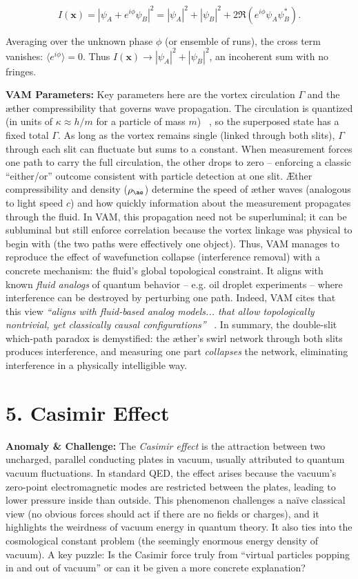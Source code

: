 \documentclass[a4paper, aps,preprint,superscriptaddress, 12pt]{revtex4}
\begin{document}
\begin{equation}
    I(\mathbf{x}) = |\psi_A + e^{i\phi}\psi_B|^2 = |\psi_A|^2 + |\psi_B|^2 + 2\Re(e^{i\phi}\psi_A \psi_B^*).
\end{equation}

Averaging over the unknown phase $\phi$ (or ensemble of runs), the cross term vanishes: $\langle e^{i\phi}\rangle = 0$. Thus $I(\mathbf{x}) \to |\psi_A|^2 + |\psi_B|^2$, an incoherent sum with no fringes.


\textbf{VAM Parameters:} Key parameters here are the vortex circulation $\Gamma$ and the æther compressibility that governs wave propagation. The circulation is quantized (in units of $\kappa \approx h/m$ for a particle of mass $m$)~\cite{Iskandarani2025c} , so the superposed state has a fixed total $\Gamma$. As long as the vortex remains single (linked through both slits), $\Gamma$ through each slit can fluctuate but sums to a constant. When measurement forces one path to carry the full circulation, the other drops to zero – enforcing a classic “either/or” outcome consistent with particle detection at one slit. Æther compressibility and density ($\rho_{\ae}$) determine the speed of æther waves (analogous to light speed $c$) and how quickly information about the measurement propagates through the fluid. In VAM, this propagation need not be superluminal; it can be subluminal but still enforce correlation because the vortex linkage was physical to begin with (the two paths were effectively one object). Thus, VAM manages to reproduce the effect of wavefunction collapse (interference removal) with a concrete mechanism: the fluid’s global topological constraint. It aligns with known \textit{fluid analogs} of quantum behavior – e.g. oil droplet experiments – where interference can be destroyed by perturbing one path. Indeed, VAM cites that this view \textit{“aligns with fluid-based analog models... that allow topologically nontrivial, yet classically causal configurations”}~\cite{Iskandarani2025c} . In summary, the double-slit which-path paradox is demystified: the æther’s swirl network through both slits produces interference, and measuring one part \textit{collapses} the network, eliminating interference in a physically intelligible way.


\section*{5. Casimir Effect}

\textbf{Anomaly \& Challenge: } The \textit{Casimir effect} is the attraction between two uncharged, parallel conducting plates in vacuum, usually attributed to quantum vacuum fluctuations. In standard QED, the effect arises because the vacuum’s zero-point electromagnetic modes are restricted between the plates, leading to lower pressure inside than outside. This phenomenon challenges a naïve classical view (no obvious forces should act if there are no fields or charges), and it highlights the weirdness of vacuum energy in quantum theory. It also ties into the cosmological constant problem (the seemingly enormous energy density of vacuum). A key puzzle: Is the Casimir force truly from “virtual particles popping in and out of vacuum” or can it be given a more concrete explanation?
\end{document}
